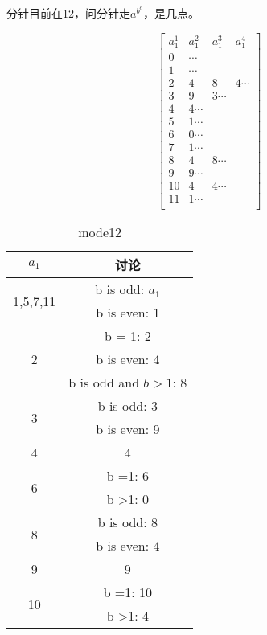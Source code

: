 \documentclass[UTF8]{../09-Mathematics}
\begin{document}
\begin{proposition}
    分针目前在12，问分针走$a^{b^c}$，是几点。

\begin{equation}
    \begin{bmatrix}
       a_1^1 & a_1^2 & a_1^3 & a_1^4\\
       0 & \cdots &  &  \\
       1 & \cdots &  &  \\
       2 & 4 & 8 & 4\cdots  \\
       3 & 9 & 3\cdots & \\
       4 & 4\cdots &  &  \\
       5 & 1\cdots &  &  \\
       6 & 0\cdots &  &  \\
       7 & 1\cdots &  &  \\
       8 & 4 & 8\cdots &  \\
       9 & 9\cdots &  &   \\
       10 & 4 & 4\cdots &   \\
       11 & 1\cdots & &   \\
    \end{bmatrix}
\end{equation}


\begin{table}[htbp]
\newcommand{\tabincell}[2]{\begin{tabular}{@{}#1@{}}#2\end
{tabular}}
\centering
    \caption{mode12}
    \label{tab:mode12}
    \begin{tabular}{cc}
    \toprule
    $a_1$ & 讨论\\
    \midrule
    \multirow{2}{*}{1,5,7,11}   & b is odd: $a_1$\\
                                & b is even: 1\\
    \midrule
    \multirow{3}{*}{2}          & b = 1: 2\\
                                & b is even: 4\\
                                & b is odd and $b>1$: 8\\
    \midrule
    \multirow{2}{*}{3}          & b is odd: 3\\
                                & b is even: 9\\
    \midrule
    \multirow{1}{*}{4}          & 4\\
    \midrule
    \multirow{2}{*}{6}          & b =1: 6\\
                                & b >1: 0\\
    \midrule
    \multirow{2}{*}{8}          & b is odd: 8\\
                                & b is even: 4\\
    \midrule
    \multirow{1}{*}{9}          & 9\\
    \midrule
    \multirow{2}{*}{10}          & b =1: 10\\
                                & b >1: 4\\
    \bottomrule
    \end{tabular}
\end{table}

\end{proposition}
\end{document}
